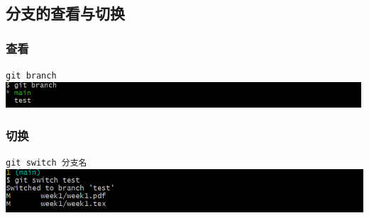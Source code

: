 \documentclass[UTF8,a4paper]{ctexart}
\begin{document}
\subsection{分支的查看与切换}
\subsubsection{查看}
\verb|git branch|\\
\includegraphics[width=1\textwidth]{branch.png}
\subsubsection{切换}
\verb|git switch 分支名|\\
\includegraphics[width=1\textwidth]{switch.png}
\end{document}
